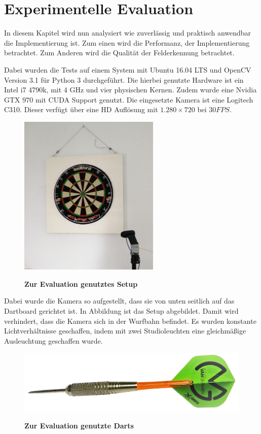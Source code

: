 
\chapter{Experimentelle Evaluation}
\label{chap:evaluation}
In diesem Kapitel wird nun analysiert wie zuverlässig und praktisch anwendbar die Implementierung ist. Zum einen wird die Performanz, der Implementierung betrachtet.  Zum Anderen wird die Qualität der Felderkennung betrachtet. 

Dabei wurden die Tests auf einem System mit Ubuntu 16.04 LTS und OpenCV Version 3.1 für Python 3 durchgeführt. Die hierbei genutzte Hardware ist ein Intel i7 4790k, mit 4 GHz und vier physischen Kernen. Zudem wurde eine Nvidia GTX 970 mit CUDA Support genutzt.
Die eingesetzte Kamera ist eine Logitech C310. Dieser verfügt über eine HD Auflösung mit  $1.280\times720$ bei $30FPS$. 

\begin{figure}[ht]
\centering
\includegraphics[width=0.6\textwidth]{media/testsetup}\\
\caption{\textbf{Zur Evaluation genutztes Setup}}
\label{Fig:testsetup}
\end{figure}
Dabei wurde die Kamera so aufgestellt, dass sie von unten seitlich auf das Dartboard gerichtet ist. In Abbildung  ist das Setup abgebildet. Damit wird verhindert, dass die Kamera sich in der Wurfbahn befindet. Es wurden konstante Lichtverhältnisse geschaffen, indem mit zwei Studioleuchten eine gleichmäßige Ausleuchtung geschaffen wurde.
\begin{figure}[ht]
\centering
\includegraphics[width=\textwidth]{media/MyDart.png}\\
\caption{\textbf{Zur Evaluation genutzte Darts}}
\label{Fig:mydart}
\end{figure}


